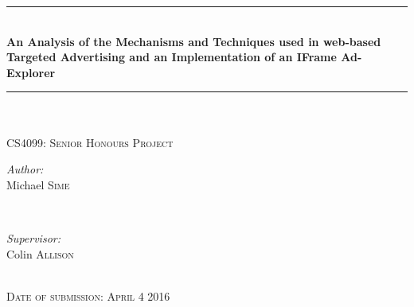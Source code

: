 \documentclass[12pt]{article}
\begin{document}
\begin{titlepage}

\newcommand{\HRule}{\rule{\linewidth}{0.5mm}} %

\center %


\HRule \\[0.4cm]
{ \Huge \bfseries An Analysis of the Mechanisms and Techniques used in web-based Targeted Advertising and an Implementation of an IFrame Ad-Explorer}\\
\HRule \\[1.5cm]



\\
 


\textsc{\Large CS4099: Senior Honours Project}\\[1cm]


\begin{minipage}{0.4\textwidth}
\begin{flushleft} \large
\emph{Author:}\\
Michael \textsc{Sime} %
\end{flushleft}
\end{minipage}
~
\begin{minipage}{0.4\textwidth}
\begin{flushright} \large
\emph{Supervisor:} \\
Colin \textsc{Allison} %
\end{flushright}
\end{minipage}\\ [0.75cm]



\textsc{\Medium Date of submission: April 4 2016}\\

\vfill %

\end{titlepage}
\end{document}
